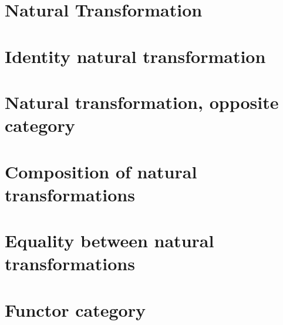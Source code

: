 \section{Natural Transformation}
    
\section{Identity natural transformation}
    
\section{Natural transformation, opposite category}
    
\section{Composition of natural transformations}
    
\section{Equality between natural transformations}
    
\section{Functor category}
    
